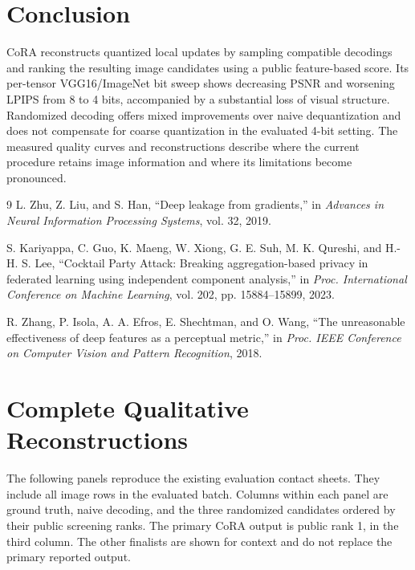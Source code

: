 \documentclass[10pt,twocolumn]{article}
\newcommand{\cora}{CoRA}
\begin{document}
\section{Conclusion}
\cora{} reconstructs quantized local updates by sampling compatible
decodings and ranking the resulting image candidates using a public
feature-based score. Its per-tensor VGG16/ImageNet bit sweep shows
decreasing PSNR and worsening LPIPS from 8 to 4 bits, accompanied by a
substantial loss of visual structure. Randomized decoding offers mixed
improvements over naive dequantization and does not compensate for
coarse quantization in the evaluated 4-bit setting. The measured quality
curves and reconstructions describe where the current procedure retains
image information and where its limitations become pronounced.

\begin{thebibliography}{9}
L. Zhu, Z. Liu, and S. Han,
``Deep leakage from gradients,''
in \emph{Advances in Neural Information Processing Systems}, vol. 32, 2019.

S. Kariyappa, C. Guo, K. Maeng, W. Xiong, G. E. Suh,
M. K. Qureshi, and H.-H. S. Lee,
``Cocktail Party Attack: Breaking aggregation-based privacy in federated
learning using independent component analysis,''
in \emph{Proc. International Conference on Machine Learning},
vol. 202, pp. 15884--15899, 2023.

R. Zhang, P. Isola, A. A. Efros, E. Shechtman, and O. Wang,
``The unreasonable effectiveness of deep features as a perceptual metric,''
in \emph{Proc. IEEE Conference on Computer Vision and Pattern Recognition},
2018.
\end{thebibliography}

\clearpage
\onecolumn
\appendix
\section{Complete Qualitative Reconstructions}
The following panels reproduce the existing evaluation contact sheets.
They include all image rows in the evaluated batch. Columns within each
panel are ground truth, naive decoding, and the three randomized
candidates ordered by their public screening ranks. The primary
\cora{} output is public rank 1, in the third column. The other finalists
are shown for context and do not replace the primary reported output.
\end{document}
